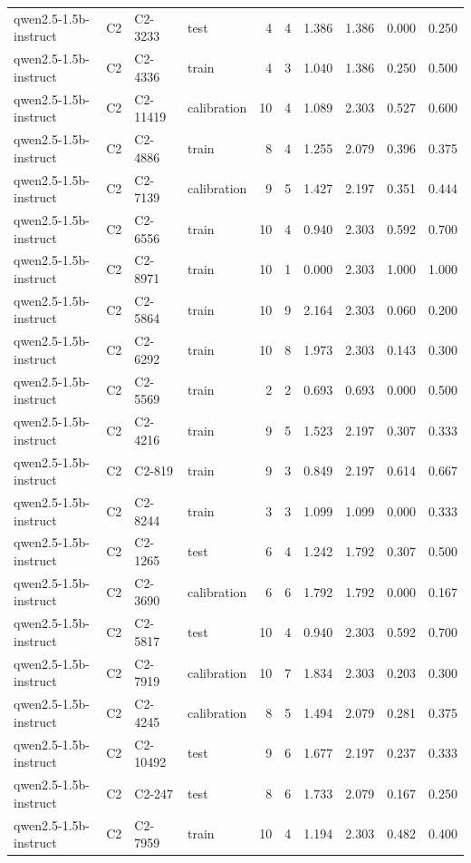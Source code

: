 \begin{table}
\begin{tabular}{llllrrrrrr}
qwen2.5-1.5b-instruct & C2 & C2-3233 & test & 4 & 4 & 1.386 & 1.386 & 0.000 & 0.250 \\
qwen2.5-1.5b-instruct & C2 & C2-4336 & train & 4 & 3 & 1.040 & 1.386 & 0.250 & 0.500 \\
qwen2.5-1.5b-instruct & C2 & C2-11419 & calibration & 10 & 4 & 1.089 & 2.303 & 0.527 & 0.600 \\
qwen2.5-1.5b-instruct & C2 & C2-4886 & train & 8 & 4 & 1.255 & 2.079 & 0.396 & 0.375 \\
qwen2.5-1.5b-instruct & C2 & C2-7139 & calibration & 9 & 5 & 1.427 & 2.197 & 0.351 & 0.444 \\
qwen2.5-1.5b-instruct & C2 & C2-6556 & train & 10 & 4 & 0.940 & 2.303 & 0.592 & 0.700 \\
qwen2.5-1.5b-instruct & C2 & C2-8971 & train & 10 & 1 & 0.000 & 2.303 & 1.000 & 1.000 \\
qwen2.5-1.5b-instruct & C2 & C2-5864 & train & 10 & 9 & 2.164 & 2.303 & 0.060 & 0.200 \\
qwen2.5-1.5b-instruct & C2 & C2-6292 & train & 10 & 8 & 1.973 & 2.303 & 0.143 & 0.300 \\
qwen2.5-1.5b-instruct & C2 & C2-5569 & train & 2 & 2 & 0.693 & 0.693 & 0.000 & 0.500 \\
qwen2.5-1.5b-instruct & C2 & C2-4216 & train & 9 & 5 & 1.523 & 2.197 & 0.307 & 0.333 \\
qwen2.5-1.5b-instruct & C2 & C2-819 & train & 9 & 3 & 0.849 & 2.197 & 0.614 & 0.667 \\
qwen2.5-1.5b-instruct & C2 & C2-8244 & train & 3 & 3 & 1.099 & 1.099 & 0.000 & 0.333 \\
qwen2.5-1.5b-instruct & C2 & C2-1265 & test & 6 & 4 & 1.242 & 1.792 & 0.307 & 0.500 \\
qwen2.5-1.5b-instruct & C2 & C2-3690 & calibration & 6 & 6 & 1.792 & 1.792 & 0.000 & 0.167 \\
qwen2.5-1.5b-instruct & C2 & C2-5817 & test & 10 & 4 & 0.940 & 2.303 & 0.592 & 0.700 \\
qwen2.5-1.5b-instruct & C2 & C2-7919 & calibration & 10 & 7 & 1.834 & 2.303 & 0.203 & 0.300 \\
qwen2.5-1.5b-instruct & C2 & C2-4245 & calibration & 8 & 5 & 1.494 & 2.079 & 0.281 & 0.375 \\
qwen2.5-1.5b-instruct & C2 & C2-10492 & test & 9 & 6 & 1.677 & 2.197 & 0.237 & 0.333 \\
qwen2.5-1.5b-instruct & C2 & C2-247 & test & 8 & 6 & 1.733 & 2.079 & 0.167 & 0.250 \\
qwen2.5-1.5b-instruct & C2 & C2-7959 & train & 10 & 4 & 1.194 & 2.303 & 0.482 & 0.400 \\

\end{tabular}
\end{table}
